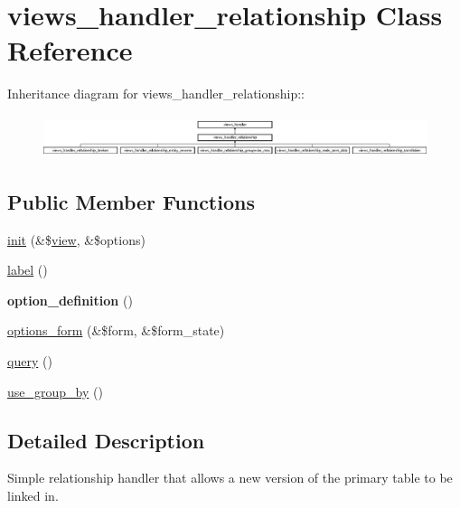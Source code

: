 \hypertarget{classviews__handler__relationship}{
\section{views\_\-handler\_\-relationship Class Reference}
\label{classviews__handler__relationship}
}
Inheritance diagram for views\_\-handler\_\-relationship::\begin{figure}[H]
\begin{center}
\leavevmode
\includegraphics[height=1.23985cm]{classviews__handler__relationship}
\end{center}
\end{figure}
\subsection*{Public Member Functions}
\begin{DoxyCompactItemize}
\item 
\hyperlink{classviews__handler__relationship_a33b2a40a9ddca4256d455137a28c4aa0}{init} (\&\$\hyperlink{classview}{view}, \&\$options)
\item 
\hyperlink{classviews__handler__relationship_af39d860cac5cd67836901304a08b43a0}{label} ()
\item 
\hypertarget{classviews__handler__relationship_a7e7b7a0056836612aa50a60575a3d549}{
{\bfseries option\_\-definition} ()}
\label{classviews__handler__relationship_a7e7b7a0056836612aa50a60575a3d549}

\item 
\hyperlink{classviews__handler__relationship_a08cc3f5947964d936b5e88d198f82c30}{options\_\-form} (\&\$form, \&\$form\_\-state)
\item 
\hyperlink{classviews__handler__relationship_a7dc0b6371807dbf06efa594cb52b3348}{query} ()
\item 
\hyperlink{classviews__handler__relationship_a23a370a6b1ba56280bbfe2262a0c91ec}{use\_\-group\_\-by} ()
\end{DoxyCompactItemize}


\subsection{Detailed Description}
Simple relationship handler that allows a new version of the primary table to be linked in.

